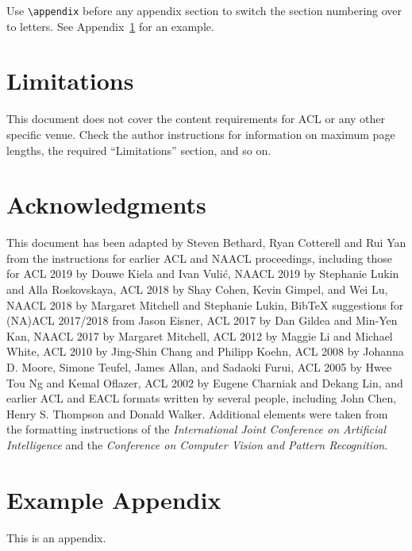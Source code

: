 \documentclass[11pt]{article}
\begin{document}
Use \verb|\appendix| before any appendix section to switch the section numbering over to letters. See Appendix~\ref{sec:appendix} for an example.


\section*{Limitations}

This document does not cover the content requirements for ACL or any
other specific venue.  Check the author instructions for
information on
maximum page lengths, the required ``Limitations'' section,
and so on.

\section*{Acknowledgments}

This document has been adapted
by Steven Bethard, Ryan Cotterell and Rui Yan
from the instructions for earlier ACL and NAACL proceedings, including those for
ACL 2019 by Douwe Kiela and Ivan Vuli\'{c},
NAACL 2019 by Stephanie Lukin and Alla Roskovskaya,
ACL 2018 by Shay Cohen, Kevin Gimpel, and Wei Lu,
NAACL 2018 by Margaret Mitchell and Stephanie Lukin,
Bib\TeX{} suggestions for (NA)ACL 2017/2018 from Jason Eisner,
ACL 2017 by Dan Gildea and Min-Yen Kan,
NAACL 2017 by Margaret Mitchell,
ACL 2012 by Maggie Li and Michael White,
ACL 2010 by Jing-Shin Chang and Philipp Koehn,
ACL 2008 by Johanna D. Moore, Simone Teufel, James Allan, and Sadaoki Furui,
ACL 2005 by Hwee Tou Ng and Kemal Oflazer,
ACL 2002 by Eugene Charniak and Dekang Lin,
and earlier ACL and EACL formats written by several people, including
John Chen, Henry S. Thompson and Donald Walker.
Additional elements were taken from the formatting instructions of the \emph{International Joint Conference on Artificial Intelligence} and the \emph{Conference on Computer Vision and Pattern Recognition}.


%


\appendix

\section{Example Appendix}
\label{sec:appendix}

This is an appendix.
\end{document}
